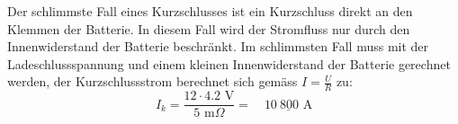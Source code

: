 Der schlimmste Fall eines Kurzschlusses ist ein Kurzschluss direkt an den Klemmen der Batterie. In diesem Fall wird der Stromfluss nur durch den Innenwiderstand der Batterie beschränkt. Im schlimmsten Fall muss mit der Ladeschlussspannung und einem kleinen Innenwiderstand der Batterie gerechnet werden, der Kurzschlussstrom berechnet sich gemäss $I=\frac{U}{R}$ zu:
\begin{equation*}
	I_k=\frac{12\cdot 4.2\text{ V}}{5\text{ m}\Omega}=\quad\underline{10\ 800\text{ A}}
\end{equation*}

\newpage
